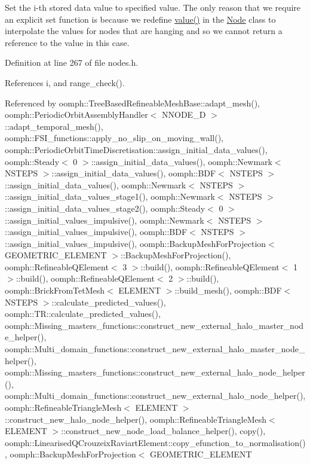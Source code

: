 Set the i-\/th stored data value to specified value. The only reason that we require an explicit set function is because we redefine \hyperlink{classoomph_1_1Data_a9383101536882db34e618cbe30dba2da}{value()} in the \hyperlink{classoomph_1_1Node}{Node} class to interpolate the values for nodes that are hanging and so we cannot return a reference to the value in this case. 



Definition at line 267 of file nodes.\+h.



References i, and range\+\_\+check().



Referenced by oomph\+::\+Tree\+Based\+Refineable\+Mesh\+Base\+::adapt\+\_\+mesh(), oomph\+::\+Periodic\+Orbit\+Assembly\+Handler$<$ N\+N\+O\+D\+E\+\_\+D $>$\+::adapt\+\_\+temporal\+\_\+mesh(), oomph\+::\+F\+S\+I\+\_\+functions\+::apply\+\_\+no\+\_\+slip\+\_\+on\+\_\+moving\+\_\+wall(), oomph\+::\+Periodic\+Orbit\+Time\+Discretisation\+::assign\+\_\+initial\+\_\+data\+\_\+values(), oomph\+::\+Steady$<$ 0 $>$\+::assign\+\_\+initial\+\_\+data\+\_\+values(), oomph\+::\+Newmark$<$ N\+S\+T\+E\+P\+S $>$\+::assign\+\_\+initial\+\_\+data\+\_\+values(), oomph\+::\+B\+D\+F$<$ N\+S\+T\+E\+P\+S $>$\+::assign\+\_\+initial\+\_\+data\+\_\+values(), oomph\+::\+Newmark$<$ N\+S\+T\+E\+P\+S $>$\+::assign\+\_\+initial\+\_\+data\+\_\+values\+\_\+stage1(), oomph\+::\+Newmark$<$ N\+S\+T\+E\+P\+S $>$\+::assign\+\_\+initial\+\_\+data\+\_\+values\+\_\+stage2(), oomph\+::\+Steady$<$ 0 $>$\+::assign\+\_\+initial\+\_\+values\+\_\+impulsive(), oomph\+::\+Newmark$<$ N\+S\+T\+E\+P\+S $>$\+::assign\+\_\+initial\+\_\+values\+\_\+impulsive(), oomph\+::\+B\+D\+F$<$ N\+S\+T\+E\+P\+S $>$\+::assign\+\_\+initial\+\_\+values\+\_\+impulsive(), oomph\+::\+Backup\+Mesh\+For\+Projection$<$ G\+E\+O\+M\+E\+T\+R\+I\+C\+\_\+\+E\+L\+E\+M\+E\+N\+T $>$\+::\+Backup\+Mesh\+For\+Projection(), oomph\+::\+Refineable\+Q\+Element$<$ 3 $>$\+::build(), oomph\+::\+Refineable\+Q\+Element$<$ 1 $>$\+::build(), oomph\+::\+Refineable\+Q\+Element$<$ 2 $>$\+::build(), oomph\+::\+Brick\+From\+Tet\+Mesh$<$ E\+L\+E\+M\+E\+N\+T $>$\+::build\+\_\+mesh(), oomph\+::\+B\+D\+F$<$ N\+S\+T\+E\+P\+S $>$\+::calculate\+\_\+predicted\+\_\+values(), oomph\+::\+T\+R\+::calculate\+\_\+predicted\+\_\+values(), oomph\+::\+Missing\+\_\+masters\+\_\+functions\+::construct\+\_\+new\+\_\+external\+\_\+halo\+\_\+master\+\_\+node\+\_\+helper(), oomph\+::\+Multi\+\_\+domain\+\_\+functions\+::construct\+\_\+new\+\_\+external\+\_\+halo\+\_\+master\+\_\+node\+\_\+helper(), oomph\+::\+Missing\+\_\+masters\+\_\+functions\+::construct\+\_\+new\+\_\+external\+\_\+halo\+\_\+node\+\_\+helper(), oomph\+::\+Multi\+\_\+domain\+\_\+functions\+::construct\+\_\+new\+\_\+external\+\_\+halo\+\_\+node\+\_\+helper(), oomph\+::\+Refineable\+Triangle\+Mesh$<$ E\+L\+E\+M\+E\+N\+T $>$\+::construct\+\_\+new\+\_\+halo\+\_\+node\+\_\+helper(), oomph\+::\+Refineable\+Triangle\+Mesh$<$ E\+L\+E\+M\+E\+N\+T $>$\+::construct\+\_\+new\+\_\+node\+\_\+load\+\_\+balance\+\_\+helper(), copy(), oomph\+::\+Linearised\+Q\+Crouzeix\+Raviart\+Element\+::copy\+\_\+efunction\+\_\+to\+\_\+normalisation(), oomph\+::\+Backup\+Mesh\+For\+Projection$<$ G\+E\+O\+M\+E\+T\+R\+I\+C\+\_\+\+E\+L\+E\+M\+E\+N\+T 